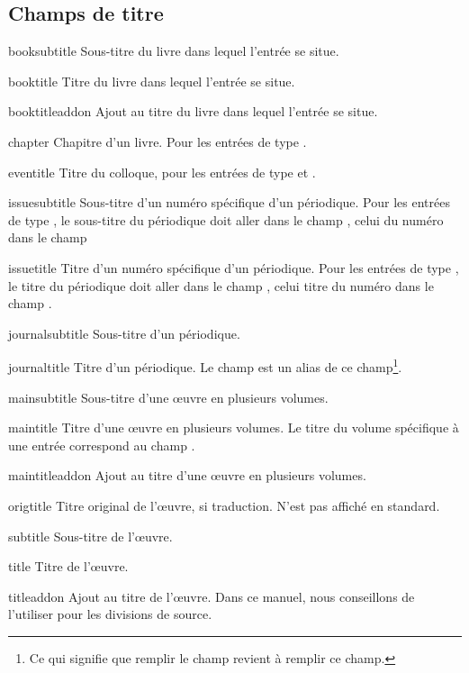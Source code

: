 \subsection{Champs de titre}


\begin{choix}
	\item[booksubtitle]Sous-titre du livre dans lequel l'entrée se situe. 
   	\item[booktitle] Titre du livre dans lequel l'entrée se situe. 		
   	\item[booktitleaddon] Ajout au titre du livre dans lequel l'entrée se situe. 
   	\item[chapter] Chapitre d'un livre. Pour les entrées de type .	
   	\item[eventitle] Titre du colloque, pour les entrées de type  et .
   	\item[issuesubtitle] Sous-titre d'un numéro spécifique d'un périodique. 	Pour les entrées de type , le sous-titre du périodique doit aller dans le champ , celui du numéro dans le champ 		
   	\item[issuetitle] Titre d'un numéro spécifique d'un périodique. Pour les entrées de type , le titre du périodique doit aller dans le champ , celui titre du numéro dans le champ .		
   	\item[journalsubtitle] Sous-titre d'un périodique.							
   	\item[journaltitle] Titre d'un périodique. Le champ  est un alias de ce champ\footnote{Ce qui signifie que remplir le champ  revient à remplir ce champ.}.				
   	\item[mainsubtitle] Sous-titre d'une œuvre en plusieurs volumes.			
   	\item[maintitle] Titre d'une œuvre en plusieurs volumes. Le titre du volume spécifique à une entrée correspond au champ .						
   	\item[maintitleaddon]  Ajout au titre d'une œuvre en plusieurs volumes.		
   	\item[origtitle] Titre original de l'œuvre, si traduction. N'est pas affiché en standard. 	
   	\item[subtitle] Sous-titre de l'œuvre.									
   	\item[title] Titre de l'œuvre.									
   	\item[titleaddon] Ajout au titre de l'œuvre. Dans ce manuel, nous conseillons de l'utiliser pour les divisions de source.
\end{choix}

